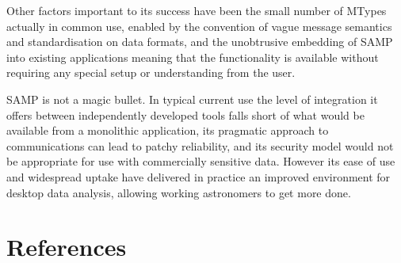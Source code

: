\documentclass[5p]{elsarticle}
\begin{document}
Other factors important to its success have been
the small number of MTypes actually in common use,
enabled by the convention of vague message semantics
and standardisation on data formats,
and the unobtrusive embedding of SAMP into existing applications
meaning that the functionality is available without
requiring any special setup or understanding from the user.

SAMP is not a magic bullet.
In typical current use the level of integration it offers
between independently developed tools falls short of what would be
available from a monolithic application,
its pragmatic approach to communications can lead to patchy reliability,
and its security model would not be appropriate for use with
commercially sensitive data.
However its ease of use and widespread uptake have delivered in practice
an improved environment for desktop data analysis,
allowing working astronomers to get more done.



\section*{References}


\end{document}
